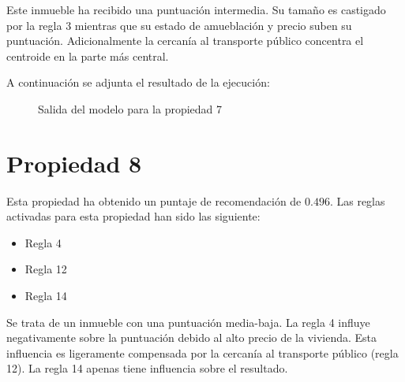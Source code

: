 \documentclass[12pt]{report} %
\begin{document}
    Este inmueble ha recibido una puntuación intermedia. Su tamaño es castigado
    por la regla 3 mientras que su estado de amueblación y precio suben su
    puntuación. Adicionalmente la cercanía al transporte público concentra el
    centroide en la parte más central.

    A continuación se adjunta el resultado de la ejecución:
    \begin{figure}[H]
        \centering
        \caption{Salida del modelo para la propiedad 7}
    \end{figure}

    \section{Propiedad 8}
    Esta propiedad ha obtenido un puntaje de recomendación de $0.496$. Las
    reglas activadas para esta propiedad han sido las siguiente:
    \begin{itemize}
        \item Regla 4
        \item Regla 12
        \item Regla 14
    \end{itemize}

    Se trata de un inmueble con una puntuación media-baja. La regla 4 influye
    negativamente sobre la puntuación debido al alto precio de la vivienda.
    Esta influencia es ligeramente compensada por la cercanía al transporte
    público (regla 12). La regla 14 apenas tiene influencia sobre el resultado.
\end{document}
